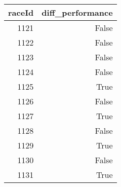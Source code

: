 \begin{tabular}{rr}
\toprule
raceId & diff_performance \\
\midrule
1121 & False \\
1122 & False \\
1123 & False \\
1124 & False \\
1125 & True \\
1126 & False \\
1127 & True \\
1128 & False \\
1129 & True \\
1130 & False \\
1131 & True \\
\bottomrule
\end{tabular}
